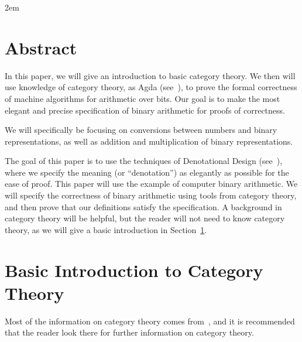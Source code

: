 \documentclass[14pt]{extarticle}  %
\begin{document}

\maketitle
\mathindent2em


\section*{Abstract}
In this paper, we will give an introduction to basic category theory. We then will use knowledge of category theory, as Agda (see~\cite{agda}), to
prove the formal correctness of machine algorithms for arithmetic over bits. Our goal is to make the most elegant and precise specification of binary arithmetic for proofs of correctness.

We will specifically be focusing on conversions between numbers and binary representations, as well as addition and multiplication of binary representations.

\tableofcontents
{}

The goal of this paper is to use the techniques of Denotational Design (see~\cite{conal}), where we specify the meaning (or ``denotation'')
as elegantly as possible for the ease of proof. This paper will use the example of computer binary arithmetic. We will specify the correctness of binary arithmetic
using tools from category theory, and then prove that our definitions satisfy the specification. A background in category theory will be helpful, but the reader
will not need to know category theory, as we will give a basic introduction in Section~\ref{sec:cat}.


\section{Basic Introduction to Category Theory}\label{sec:cat}
Most of the information on category theory comes from~\cite{cats}, and it is recommended that the reader look there for further information on category theory.
\end{document}
